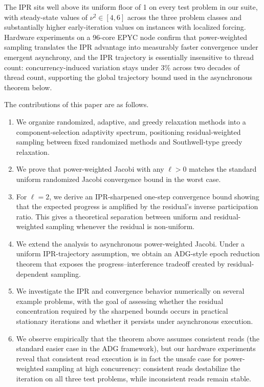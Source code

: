 \documentclass[pdflatex,sn-mathphys-num]{sn-jnl}%
\theoremstyle{thmstyleone}%
\theoremstyle{thmstyletwo}%
\theoremstyle{thmstylethree}%
\begin{document}
The IPR sits well above its uniform floor of 1 on every test problem
in our suite, with steady-state values of $\nu^2 \in [4, 6]$ across the
three problem classes and substantially higher early-iteration values on
instances with localized forcing. Hardware experiments on a 96-core EPYC
node confirm that power-weighted sampling translates the IPR advantage
into measurably faster convergence under emergent asynchrony, and the IPR
trajectory is essentially insensitive to thread count: concurrency-induced
variation stays under 3\% across two decades of thread count, supporting
the global trajectory bound used in the asynchronous theorem below.

The contributions of this paper are as follows.

\begin{enumerate}
    \item We organize randomized, adaptive, and greedy relaxation methods into a
    component-selection adaptivity spectrum, positioning residual-weighted
    sampling between fixed randomized methods and Southwell-type greedy
    relaxation.

    \item We prove that power-weighted Jacobi with any $\ell>0$ matches the
    standard uniform randomized Jacobi convergence bound in the worst case.

    \item For $\ell=2$, we derive an IPR-sharpened one-step convergence bound showing
    that the expected progress is amplified by the residual's inverse
    participation ratio.  This gives a theoretical separation between uniform
    and residual-weighted sampling whenever the residual is non-uniform.

    \item We extend the analysis to asynchronous power-weighted Jacobi.  Under a
    uniform IPR-trajectory assumption, we obtain an ADG-style epoch reduction
    theorem that exposes the progress--interference tradeoff created by
    residual-dependent sampling.

    \item We investigate the IPR and convergence behavior numerically on
    several example problems, with the goal of assessing whether the residual
    concentration required by the sharpened bounds occurs in practical
    stationary iterations and whether it persists under asynchronous execution.

    \item We observe empirically that the theorem above assumes consistent
    reads (the standard easier case in the ADG framework), but our hardware
    experiments reveal that consistent read execution is in fact the unsafe case for
    power-weighted sampling at high concurrency: consistent reads destabilize
    the iteration on all three test problems, while inconsistent reads remain
    stable. %
\end{enumerate}
\end{document}
